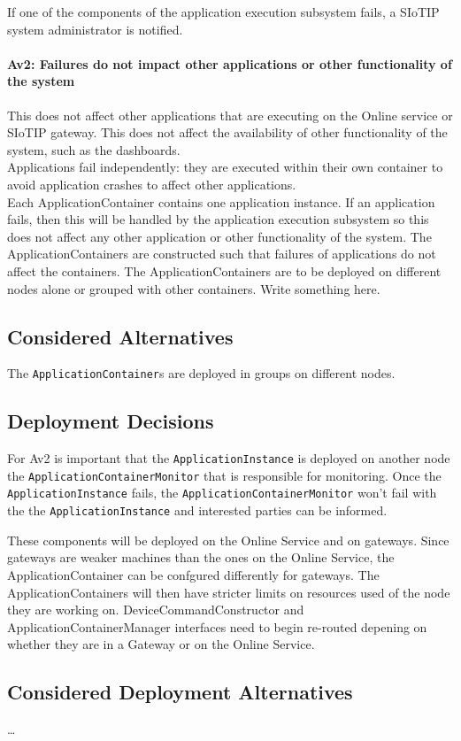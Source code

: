             If one of the components of the application execution subsystem fails,
            a SIoTIP system administrator is notified.

        \paragraph{Av2: Failures do not impact other applications or other functionality of the system}
            This does not affect other applications that are executing on the Online
            service or SIoTIP gateway. This does not affect the availability of
            other functionality of the system, such as the dashboards. \\
            Applications fail independently: they are executed within their own
            container to avoid application crashes to affect other applications.\\

            Each ApplicationContainer contains one application instance. If an application fails,
            then this will be handled by the application execution subsystem so this
            does not affect any other application or other functionality of the system.
            The ApplicationContainers are constructed such that failures of applications
            do not affect the containers. The ApplicationContainers are to be deployed
            on different nodes alone or grouped with other containers. Write something here.

    \subsection*{Considered Alternatives}
         The \texttt{ApplicationContainer}s are deployed in groups on different nodes.

    \subsection*{Deployment Decisions}
        For Av2 is important that the \texttt{ApplicationInstance} is deployed on another node the \texttt{ApplicationContainerMonitor} that is responsible for
        monitoring. Once the \texttt{ApplicationInstance} fails, the \texttt{ApplicationContainerMonitor} won't fail with the the \texttt{ApplicationInstance}
        and interested parties can be informed.

        These components will be deployed on the Online Service and on gateways.
        Since gateways are weaker machines than the ones on the Online Service,
        the ApplicationContainer can be confgured differently for gateways.
        The ApplicationContainers will then have stricter limits on
        resources used of the node they are working on.
        DeviceCommandConstructor and ApplicationContainerManager interfaces need to begin
        re-routed depening on whether they are in a Gateway or on the Online Service.


    \subsection*{Considered Deployment Alternatives}
        \ldots
